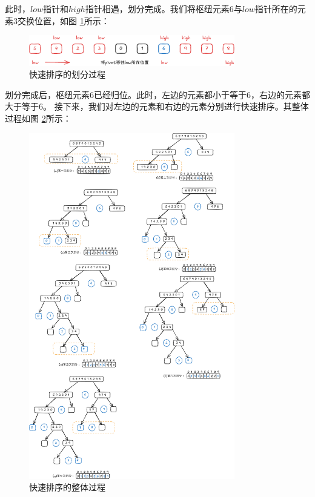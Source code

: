 \documentclass[lang=cn,newtx,10pt,scheme=chinese]{../elegantbook}
\begin{document}
此时，$low$指针和$high$指针相遇，划分完成。我们将枢纽元素6与$low$指针所在的元素3交换位置，如图 \ref{fig:patition_i}所示：

\begin{figure}
[h!]
    \centering
    \includegraphics[width=0.8\textwidth]{./figure/pdf/cropped/patition_i.pdf}
    \caption{快速排序的划分过程}
    \label{fig:patition_i}
\end{figure}


划分完成后，枢纽元素6已经归位。此时，左边的元素都小于等于6，右边的元素都大于等于6。
接下来，我们对左边的元素和右边的元素分别进行快速排序。其整体过程如图 \ref{fig:quickSort}所示：

\begin{figure}[h!]
    \centering
    \includegraphics[width=0.8\textwidth]{./figure/pdf/cropped/quickSort.pdf}
    \caption{快速排序的整体过程}
    \label{fig:quickSort}
\end{figure}
\end{document}
